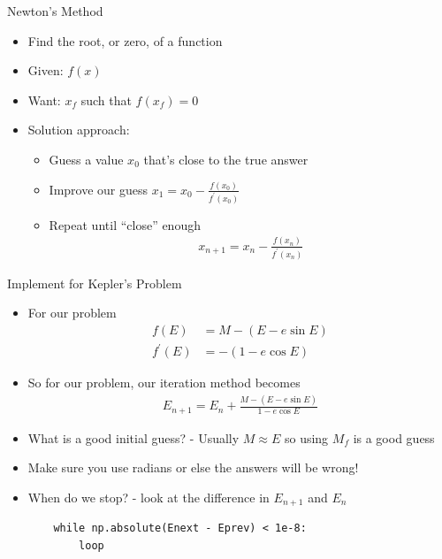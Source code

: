 \documentclass[11pt,professionalfonts]{beamer}
\begin{document}
\begin{frame}{Newton's Method}
    \begin{itemize}
        \item Find the root, or zero, of a function
        \item Given: \( f(x) \) 
        \item Want: \( x_f \) such that \( f(x_f) = 0 \)
        \item Solution approach:
            \begin{itemize}
                \item Guess a value \( x_0 \) that's close to the true answer
                \item Improve our guess \( x_1 = x_0 - \frac{f(x_0)}{f^{\prime}(x_0)}\)
                \item Repeat until ``close'' enough
                    \begin{align*}
                        x_{n+1} = x_n - \frac{f(x_n)}{f^{\prime}(x_n)}
                    \end{align*}
            \end{itemize}
    \end{itemize}
\end{frame}

\begin{frame}[fragile]{Implement for Kepler's Problem}
    \begin{itemize}
        \item For our problem
            \begin{align*}
                f(E) &= M - (E - e \sin E) \\
                f^{\prime}(E) &= - ( 1 - e \cos E)
            \end{align*}
        \item So for our problem, our iteration method becomes
            \begin{align*}
                E_{n+1} = E_n  + \frac{M - (E - e \sin E)}{1 - e \cos E}
            \end{align*}
        \item What is a good initial guess? - Usually \( M \approx E \) so using \( M_f \) is a good guess
        \item Make sure you use radians or else the answers will be wrong!
        \item When do we stop? - look at the difference in \( E_{n+1} \) and \( E_n \)
\begin{verbatim}
    while np.absolute(Enext - Eprev) < 1e-8:
        loop
    \end{verbatim}
    \end{itemize}
\end{frame}
\end{document}
